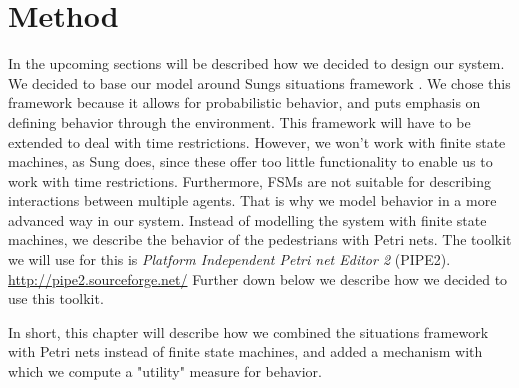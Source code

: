 \documentclass[11pt, a4paper]{book}
\begin{document}
\chapter{Method}
In the upcoming sections will be described how we decided to design our system. We decided to base our model around Sungs situations framework \cite{Sung04scalablebehaviors}. We chose this framework because it allows for probabilistic behavior, and puts emphasis on defining behavior through the environment. This framework will have to be extended to deal with time restrictions. However, we won't work with finite state machines, as Sung does, since these offer too little functionality to enable us to work with time restrictions. Furthermore, FSMs are not suitable for describing interactions between multiple agents. That is why we model behavior in a more advanced way in our system. Instead of modelling the system with finite state machines, we describe the behavior of the pedestrians with Petri nets.  The toolkit we will use for this is \emph{Platform Independent Petri net Editor 2} (PIPE2). \url{http://pipe2.sourceforge.net/} Further down below we describe how we decided to use this toolkit.

In short, this chapter will describe how we combined the situations framework with Petri nets instead of finite state machines, and added a mechanism with which we compute a "utility" measure for behavior.
\end{document}
